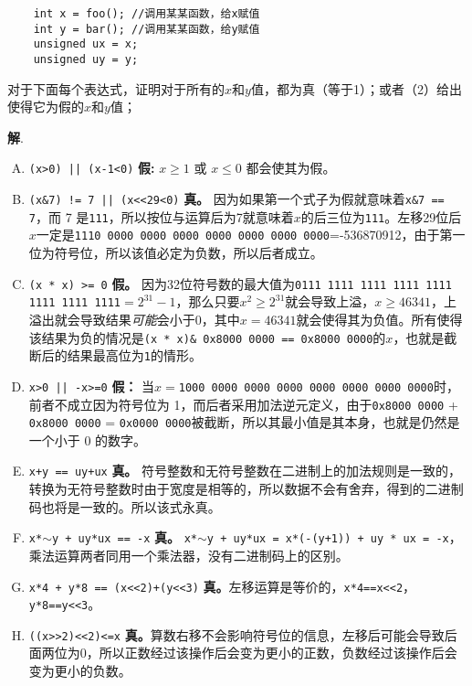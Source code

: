\documentclass[12pt,a4paper]{article}
\newenvironment{problems}{\begin{list}{}{\renewcommand{\makelabel}[1]{\textbf{##1}.\hfil}}}{\end{list}}
\providecommand{\sol}{\textbf{解}.~}
\begin{document}
\begin{problems}
    \begin{verbatim} 
    int x = foo(); //调用某某函数，给x赋值
    int y = bar(); //调用某某函数，给y赋值
    unsigned ux = x;
    unsigned uy = y;
    \end{verbatim}

    对于下面每个表达式，证明对于所有的$x$和$y$值，都为真（等于1）；或者（2）给出使得它为假的$x$和$y$值；

    \sol \begin{enumerate}[A.]
        \item \texttt{(x>0) || (x-1<0)} \textbf{假:} $x\geq 1$ 或 $x \leq 0$ 都会使其为假。
        \item \texttt{(x\&7) != 7 || (x<<29<0)} \textbf{真。} 因为如果第一个式子为假就意味着\texttt{x\&7 == 7}，而 7 是\texttt{111}，所以按位与运算后为7就意味着$x$的后三位为\texttt{111}。左移29位后$x$一定是\texttt{1110 0000 0000 0000 0000 0000 0000 0000}=-536870912，由于第一位为符号位，所以该值必定为负数，所以后者成立。
        \item \texttt{(x * x) >= 0} \textbf{假。} 因为32位符号数的最大值为\texttt{0111 1111 1111 1111 1111 1111 1111 1111}$=2^{31}-1$，那么只要$x^2\geq 2^{31}$就会导致上溢，$x\geq 46341$，上溢出就会导致结果\emph{可能}会小于0，其中$x=46341$就会使得其为负值。所有使得该结果为负的情况是\texttt{(x * x)\& 0x8000 0000 == 0x8000 0000}的$x$，也就是截断后的结果最高位为\texttt{1}的情形。%
        \item \texttt{x>0 || -x>=0} \textbf{假：} 当$x=$\texttt{1000 0000 0000 0000 0000 0000 0000 0000}时，前者不成立因为符号位为 1，而后者采用加法逆元定义，由于\texttt{0x8000 0000} + \texttt{0x8000 0000} = \texttt{0x0000 0000}被截断，所以其最小值是其本身，也就是仍然是一个小于 0 的数字。
        \item \texttt{x+y == uy+ux} \textbf{真。} 符号整数和无符号整数在二进制上的加法规则是一致的，转换为无符号整数时由于宽度是相等的，所以数据不会有舍弃，得到的二进制码也将是一致的。所以该式永真。
        \item \texttt{x*$\sim$y + uy*ux == -x} \textbf{真。} \texttt{x*$\sim$y + uy*ux = x*(-(y+1)) + uy * ux = -x}，乘法运算两者同用一个乘法器，没有二进制码上的区别。
        \item \texttt{x*4 + y*8 == (x<<2)+(y<<3)} \textbf{真。}左移运算是等价的，\texttt{x*4==x<<2}，\texttt{y*8==y<<3}。
        \item \texttt{((x>>2)<<2)<=x} \textbf{真。}算数右移不会影响符号位的信息，左移后可能会导致后面两位为0，所以正数经过该操作后会变为更小的正数，负数经过该操作后会变为更小的负数。
    \end{enumerate}
    

\end{problems}
\end{document}

